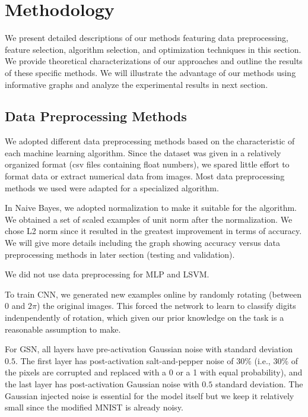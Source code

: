 \documentclass{acm_proc_article-sp}
\begin{document}
\section{Methodology}
We present detailed descriptions of our methods featuring data preprocessing, feature selection, algorithm selection, and optimization techniques in this section.  We provide theoretical characterizations of our approaches and outline the results of these specific methods. We will illustrate the advantage of our methods using informative graphs and analyze the experimental results in next section.


\subsection{Data Preprocessing Methods}
We adopted different data preprocessing methods based on the characteristic of each machine learning algorithm. Since the dataset was given in a relatively organized format (csv files containing float numbers), we spared little effort to format data or extract numerical data from images. Most data preprocessing methods we used were adapted for a specialized algorithm.

In Naive Bayes, we adopted normalization to  make it suitable for the algorithm. We obtained a set of scaled examples of unit norm after the normalization. We chose L2 norm since it resulted in the greatest improvement in terms of accuracy. We will give more details including the graph showing accuracy versus data preprocessing methods in later section (testing and validation).

We did not use data preprocessing for MLP and LSVM.

To train CNN, we generated new examples online by randomly rotating (between 0 and $2\pi$) the original images. This forced the network to learn to classify digits indenpendently of rotation, which given our prior knowledge on the task is a reasonable assumption to make.

For GSN, all layers have pre-activation Gaussian noise with standard deviation $0.5$. The first layer has post-activation salt-and-pepper noise of $30\%$ (i.e., $30\%$ of the pixels are corrupted and replaced with a 0 or a 1 with equal probability), and the last layer has post-activation Gaussian noise with $0.5$ standard deviation. The Gaussian injected noise is essential for the model itself but we keep it relatively small since the modified MNIST is already noisy. 
\end{document}
